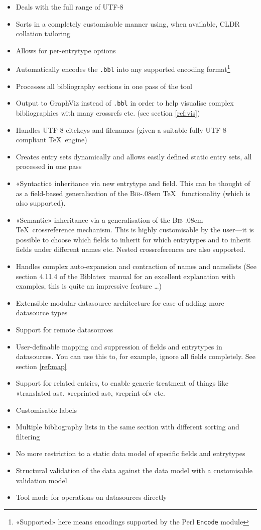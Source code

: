 \documentclass{ltxdockit}
\def\BibTeX{\textsc{Bib}\kern-.08em \TeX}
\newcommand*{\biblatex}{Biblatex\xspace}
\begin{document}
\begin{itemize}
\item Deals with the full range of UTF-8
\item Sorts in a completely customisable manner using, when available,
  CLDR collation tailoring
\item Allows for per-entrytype options
\item Automatically encodes the \verb+.bbl+ into any supported encoding
  format\footnote{«Supported» here means encodings supported by the
    Perl \texttt{Encode} module}
\item Processes all bibliography sections in one pass of the tool
\item Output to GraphViz instead of \verb+.bbl+ in order to help visualise
  complex bibliographies with many crossrefs etc. (see section \ref{ref:vis})
\item Handles UTF-8 citekeys and filenames (given a suitable fully
  UTF-8 compliant \TeX\ engine)
\item Creates entry sets dynamically and allows easily defined static entry sets,
  all processed in one pass
\item «Syntactic» inheritance via new  entrytype and
  field. This can be thought of as a field-based generalisation of the
  \BibTeX\  functionality (which is also supported).
\item «Semantic» inheritance via a generalisation of the \BibTeX\
  crossreference mechanism. This is highly customisable by the
  user---it is possible to choose which fields to inherit for which
  entrytypes and to inherit fields under different names etc. Nested
  crossreferences are also supported.
\item Handles complex auto-expansion and contraction of names and
  namelists (See section 4.11.4 of the \biblatex\ manual for an excellent
  explanation with examples, this is quite an impressive feature \ldots)
\item Extensible modular datasource architecture for ease of adding
  more datasource types
\item Support for remote datasources
\item User-definable mapping and suppression of fields and entrytypes in
  datasources. You can use this to, for example, ignore all
   fields completely. See section \ref{ref:map}
\item Support for related entries, to enable generic treatment of things
  like «translated as», «reprinted as», «reprint of»
  etc.
\item Customisable labels
\item Multiple bibliography lists in the same section with different
  sorting and filtering
\item No more restriction to a static data model of specific fields and
  entrytypes
\item Structural validation of the data against the data model with a
  customisable validation model
\item Tool mode for operations on datasources directly
\end{itemize}
\end{document}
